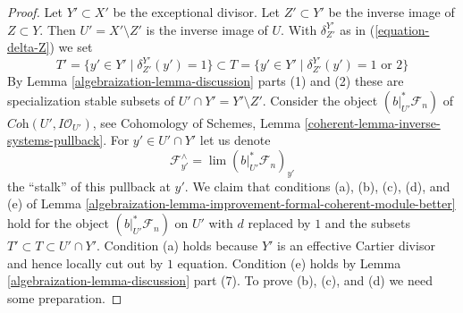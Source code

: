 \begin{proof}

Let $Y' \subset X'$ be the exceptional divisor.
Let $Z' \subset Y'$ be the inverse image of $Z \subset Y$.
Then $U' = X' \setminus Z'$ is the inverse image of $U$.
With $\delta^{Y'}_{Z'}$ as in (\ref{equation-delta-Z}) we set
$$
T' = \{y' \in Y' \mid \delta^{Y'}_{Z'}(y') = 1\}
\subset
T = \{y' \in Y' \mid \delta^{Y'}_{Z'}(y') = 1\text{ or }2\}
$$
By Lemma \ref{algebraization-lemma-discussion} parts (1) and (2) these are specialization
stable subsets of $U' \cap Y' = Y' \setminus Z'$. Consider the
object $(b|_{U'}^*\mathcal{F}_n)$ of $\textit{Coh}(U', I\mathcal{O}_{U'})$,
see Cohomology of Schemes, Lemma \ref{coherent-lemma-inverse-systems-pullback}.
For $y' \in U' \cap Y'$ let us denote
$$
\mathcal{F}_{y'}^\wedge = \lim (b|_{U'}^*\mathcal{F}_n)_{y'}
$$
the ``stalk'' of this pullback at $y'$. We claim that conditions
(a), (b), (c), (d), and (e) of
Lemma \ref{algebraization-lemma-improvement-formal-coherent-module-better}
hold for the object $(b|_{U'}^*\mathcal{F}_n)$ on $U'$ with $d$
replaced by $1$ and the subsets $T' \subset T \subset U' \cap Y'$.
Condition (a) holds because $Y'$ is an effective Cartier divisor
and hence locally cut out by $1$ equation. Condition (e) holds
by Lemma \ref{algebraization-lemma-discussion} part (7).
To prove (b), (c), and (d) we need some preparation.


\end{proof}
